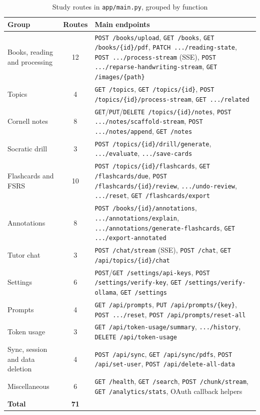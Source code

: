\begin{table}[htbp]
\centering\small
\caption{Study routes in \texttt{app/main.py}, grouped by function}\label{tab:api_legacy}
\begin{tabularx}{\textwidth}{@{}>{\raggedright\arraybackslash}p{} c >{\raggedright\arraybackslash}X@{}}
\toprule
\textbf{Group} & \textbf{Routes} & \textbf{Main endpoints}\\
\midrule
Books, reading and processing & 12 & \texttt{POST /books/upload}, \texttt{GET /books}, \texttt{GET /books/\{id\}/pdf}, \texttt{PATCH .../reading-state}, \texttt{POST .../process-stream} (SSE), \texttt{POST .../reparse-handwriting-stream}, \texttt{GET /images/\{path\}}\\
Topics & 4 & \texttt{GET /topics}, \texttt{GET /topics/\{id\}}, \texttt{POST /topics/\{id\}/process-stream}, \texttt{GET .../related}\\
Cornell notes & 8 & \texttt{GET}/\texttt{PUT}/\texttt{DELETE /topics/\{id\}/notes}, \texttt{POST .../notes/scaffold-stream}, \texttt{POST .../notes/append}, \texttt{GET /notes}\\
Socratic drill & 3 & \texttt{POST /topics/\{id\}/drill/generate}, \texttt{.../evaluate}, \texttt{.../save-cards}\\
Flashcards and FSRS & 10 & \texttt{POST /topics/\{id\}/flashcards}, \texttt{GET /flashcards/due}, \texttt{POST /flashcards/\{id\}/review}, \texttt{.../undo-review}, \texttt{.../reset}, \texttt{GET /flashcards/export}\\
Annotations & 8 & \texttt{POST /books/\{id\}/annotations}, \texttt{.../annotations/explain}, \texttt{.../annotations/generate-flashcards}, \texttt{GET .../export-annotated}\\
Tutor chat & 3 & \texttt{POST /chat/stream} (SSE), \texttt{POST /chat}, \texttt{GET /api/topics/\{id\}/chat}\\
Settings & 6 & \texttt{POST}/\texttt{GET /settings/api-keys}, \texttt{POST /settings/verify-key}, \texttt{GET /settings/verify-ollama}, \texttt{GET /settings}\\
Prompts & 4 & \texttt{GET /api/prompts}, \texttt{PUT /api/prompts/\{key\}}, \texttt{POST .../reset}, \texttt{POST /api/prompts/reset-all}\\
Token usage & 3 & \texttt{GET /api/token-usage/summary}, \texttt{.../history}, \texttt{DELETE /api/token-usage}\\
Sync, session and data deletion & 4 & \texttt{POST /api/sync}, \texttt{GET /api/sync/pdfs}, \texttt{POST /api/set-user}, \texttt{POST /api/delete-all-data}\\
Miscellaneous & 6 & \texttt{GET /health}, \texttt{GET /search}, \texttt{POST /chunk/stream}, \texttt{GET /analytics/stats}, OAuth callback helpers\\
\midrule
\textbf{Total} & \textbf{71} & \\
\bottomrule
\end{tabularx}
\end{table}


